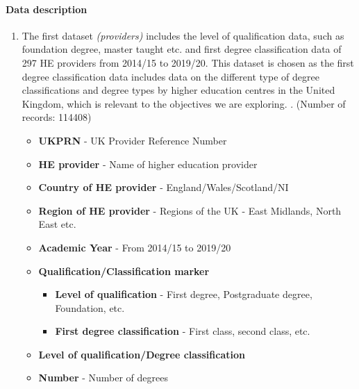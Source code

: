 \documentclass[11pt,a4paper]{article}
\begin{document}
\paragraph{Data description} 
\begin{enumerate}
  \item The first dataset \textit{(providers)} includes the level of qualification data, such as foundation degree, master taught etc. and first degree classification data of 297 HE providers from 2014/15 to 2019/20. This dataset is chosen as the first degree classification data includes data on the different type of degree classifications and degree types by higher education centres in the United Kingdom, which is relevant to the objectives we are exploring. \cite{UKPRN_Data_1}. (Number of records: 114408) 
  \begin{multicols}{2}
  \begin{itemize}
      \item \textbf{UKPRN} - UK Provider Reference Number \cite{UKPRN}
      \item \textbf{HE provider} - Name of higher education provider
      \item \textbf{Country of HE provider} - England/Wales/Scotland/NI
      \item \textbf{Region of HE provider} - Regions of the UK - East Midlands, North East etc.
      \item \textbf{Academic Year} - From 2014/15 to 2019/20
      \item \textbf{Qualification/Classification marker}
      \begin{itemize}
            \item \textbf{Level of qualification} - First degree, Postgraduate degree, Foundation, etc.
            \item \textbf{First degree classification} - First class, second class, etc.
      \end{itemize}
      \item \textbf{Level of qualification/Degree classification}
      \item \textbf{Number} - Number of degrees
  \end{itemize}
  \end{multicols}
  

\end{enumerate}
\end{document}
